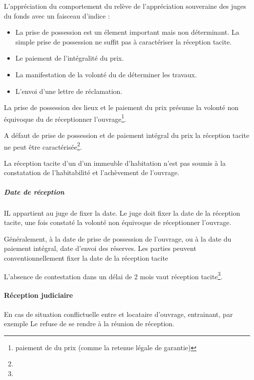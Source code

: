 			L’appréciation du comportement du \MO relève de l’appréciation souveraine des juges du fonds avec un faisceau d’indice :
			\begin{itemize}
				\item La prise de possession est un élement important mais non déterminant. La simple prise de possession ne suffit pas à caractériser la réception tacite.

				\item Le paiement de l’intégralité du prix.

				\item La manifestation de la volonté du \MO de déterminer les travaux.

				\item L’envoi d’une lettre de réclamation.
			\end{itemize}

			La prise de possession des lieux et le paiement du prix présume la volonté non équivoque du \MO de réceptionner l’ouvrage\footnote{ paiement de  du prix (comme la retenue légale de garantie)}.

			A défaut de prise de possession et de paiement intégral du prix la réception tacite ne peut être caractérisée\footnote{}.

			La réception tacite d’un \MO d’un immeuble d’habitation n’est pas soumis à la constatation de l’habitabilité et l’achèvement de l’ouvrage. %

			\subparagraph{Date de réception}

			IL appartient au juge de fixer la date. Le juge doit fixer la date de la réception tacite, une fois constaté la volonté non équivoque de réceptionner l’ouvrage.

			Généralement, à la date de prise de possession de l’ouvrage, ou à la date du paiement intégral, date d’envoi des réserves. Les parties peuvent conventionnellement fixer la date de la réception tacite

			L'absence de contestation dans un délai de 2 mois  vaut réception tacite\footnote{}.


			\paragraph{Réception judiciaire}


			En cas de situation conflictuelle entre \MO et locataire d’ouvrage, entrainant, par exemple Le \MO refuse de se rendre à la réunion de réception.

